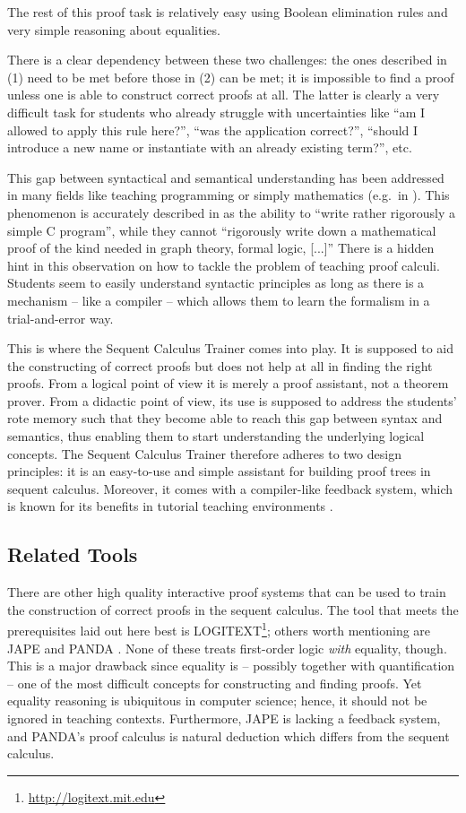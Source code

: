 \documentclass[a4paper,UKenglish]{lipics}
\begin{document}
The rest of this proof task is relatively easy using Boolean elimination rules and very simple reasoning about equalities. 
\medskip

There is a clear dependency between these two challenges: the ones described in (1) need to be met before those in (2) can be met; it is impossible to
find a proof unless one is able to construct correct proofs at all. The latter is clearly a very difficult task for students who already struggle with 
uncertainties like ``am I allowed to apply this rule here?'', ``was the application correct?'', ``should I introduce a new name or instantiate with 
an already existing term?'', etc.

This gap between syntactical and semantical understanding has been addressed in many
fields like teaching programming or simply mathematics (e.g.\ in \cite{DBLP:journals/ijpp/ShneidermanM79}).  This phenomenon is accurately described in
\cite{DBLP:conf/ticttl/GasquetSS11a} as the ability to ``write rather rigorously a simple C program'', while they cannot ``rigorously write down a
mathematical proof of the kind needed in graph theory, formal logic, [...]''  There is a hidden hint in this observation on how to tackle the problem
of teaching proof calculi. Students seem to easily understand syntactic principles as long as there is a mechanism -- like a compiler -- which allows them 
to learn the formalism in a trial-and-error way.

This is where the Sequent Calculus Trainer comes into play. It is supposed to aid the constructing of correct proofs but does not help at all in finding 
the right proofs. From a logical point of view it is merely a proof assistant, not a theorem prover. From a didactic point of view, its use is supposed
to address the students' rote memory such that they become able to reach this gap between syntax and semantics, thus enabling them to start understanding
the underlying logical concepts. The Sequent Calculus Trainer therefore adheres to two design principles: it is an easy-to-use and simple assistant for
building proof trees in sequent calculus. Moreover, it comes with a compiler-like feedback system, which is known for its benefits in tutorial
teaching environments \cite{Anderson1995}.
 
\subsection{Related Tools}
There are other high quality interactive proof systems that can be used to train the construction of correct proofs in the sequent calculus. The tool that
meets the prerequisites laid out here best is LOGITEXT\footnote{\url{http://logitext.mit.edu}}; others worth mentioning are JAPE \cite{DBLP:journals/cj/BornatS99} and PANDA
\cite{DBLP:conf/ticttl/GasquetSS11a}. None of these treats first-order logic \emph{with} equality, though. This is a major drawback since equality is --
possibly together with quantification -- one of the most difficult concepts for constructing and finding proofs. Yet equality reasoning is ubiquitous in
computer science; hence, it should not be ignored in teaching contexts. Furthermore, JAPE is lacking a feedback system, and PANDA's proof calculus is
natural deduction which differs from the sequent calculus. 
\end{document}
